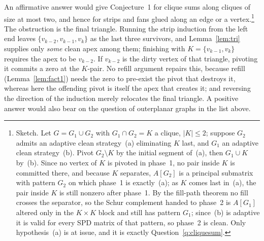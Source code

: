 \documentclass[11pt]{article}
\theoremstyle{plain}
\theoremstyle{definition}
\theoremstyle{remark}
\begin{document}
\begin{humanblock}
An affirmative answer would give Conjecture~1 for clique sums along cliques of size at most two, and
hence for strips and fans glued along an edge or a vertex.\footnote{%
Sketch. Let $G=G_1\cup G_2$ with $G_1\cap G_2=K$ a clique, $|K|\le2$; suppose $G_2$ admits an adaptive
clean strategy~(a) eliminating $K$ last, and $G_1$ an adaptive clean strategy~(b). Pivot
$G_2\setminus K$ by the initial segment of~(a), then $G_1\cup K$ by~(b). Since no vertex of $K$ is
pivoted in phase~1, no pair inside $K$ is committed there, and because $K$ separates, $A[G_2]$ is a
principal submatrix with pattern $G_2$ on which phase~1 is exactly~(a); as $K$ comes last in~(a), the
pair inside $K$ is still nonzero after phase~1. By the fill-path theorem no fill crosses the
separator, so the Schur complement handed to phase~2 is $A[G_1]$ altered only in the $K\times K$ block
and still has pattern $G_1$; since~(b) is adaptive it is valid for every SPD matrix of that pattern,
so phase~2 is clean. Only hypothesis~(a) is at issue, and it is exactly
Question~\ref{q:cliquesum}.}
The obstruction is the final triangle. Running the strip induction from the left end leaves
$\{v_{k-2},v_{k-1},v_k\}$ as the last three survivors, and Lemma~\ref{lem:tri} supplies only
\emph{some} clean apex among them; finishing with $K=\{v_{k-1},v_k\}$ requires the apex to be
$v_{k-2}$. If $v_{k-2}$ is the dirty vertex of that triangle, pivoting it commits a zero at the
$K$-pair. No refill argument repairs this, because refill (Lemma~\ref{lem:fact1}) needs the zero to
pre-exist the pivot that destroys it, whereas here the offending pivot is itself the apex that creates
it; and reversing the direction of the induction merely relocates the final triangle. A positive
answer would also bear on the question of outerplanar graphs in the list above.
\end{humanblock}
\end{document}
